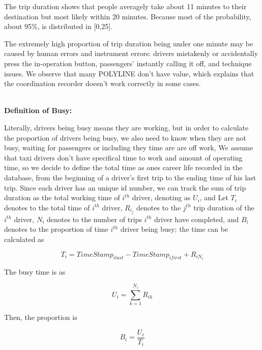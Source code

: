\documentclass[11pt]{article}
\begin{document}
\par
The trip duration shows that people averagely take about 11 minutes to their destination but most likely within
 20 minutes. Because most of the probability, about 95\%, is distributed in [0,25].
\par
The extremely high proportion of trip duration being under one minute may be caused by human errors and instrument
 errors: drivers mistakenly or accidentally press the in-operation button, passengers' instantly calling it off,
 and technique issues. We observe that many POLYLINE don't have value, which explains that the coordination
 recorder doesn't work correctly in some cases. 

\\
\textbf{Definition of Busy:}

\par
Literally, drivers being busy means they are working, but in order to calculate the proportion of drivers being busy, we also need to know when they are not busy, waiting for passengers or including they time are are off work, We assume that taxi drivers don’t have specifical time to work and amount of operating time, so we decide to define the total time as ones career life recorded in the database, from the beginning of a driver’s first trip to the ending time of his last trip. Since each driver has an unique id number, we can track the sum of trip duration as the total working time 
of $i^{th}$ driver, denoting as $U_{i}$, and Let $T_i$ denotes to the total time of $i^{th}$ driver, $R_{i_j}$ denotes to the $j^{th}$ trip duration of the $i^{th}$ driver, $N_i$ denotes to the number of trips $i^{th}$ driver have completed, and $B_i$ denotes to the proportion of time $i^{th}$ driver being busy; the time can be calculated as

\begin{equation}
T_i =TimeStamp_{i last}-TimeStamp_{i first} +R_{iN_i}
\end{equation}

\par
The busy time is as

\begin{equation}
U_i = \sum_{k=1}^{N_i} R_{ik}
\end{equation}

\par
Then, the proportion is

\begin{equation}
B_i = \frac{U_i}{T_i}
\end{equation}
\end{document}
